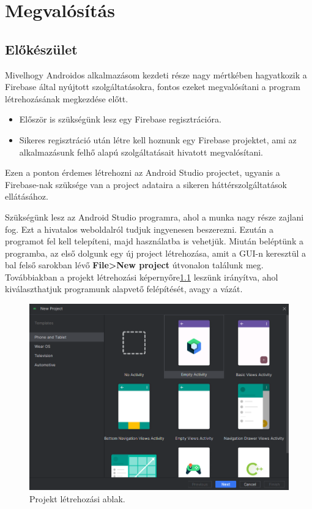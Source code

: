 \chapter{Megvalósítás}

\section{Előkészület}

Mivelhogy Androidos alkalmazásom kezdeti része nagy mértkében hagyatkozik a Firebase által nyújtott szolgáltatásokra, fontos ezeket megvalósítani a program létrehozásának megkezdése előtt.
\begin{itemize}
    \item Először is szükségünk lesz egy Firebase regisztrációra.
    \item Sikeres regisztráció után létre kell hoznunk egy Firebase projektet, ami az alkalmazásunk felhő alapú szolgáltatásait hivatott megvalósítani.
\end{itemize}

Ezen a ponton érdemes létrehozni az Android Studio projectet, ugyanis a Firebase-nak szüksége van a project adataira a sikeren háttérszolgáltatások ellátásához.

Szükségünk lesz az Android Studio programra, ahol a munka nagy része zajlani fog.
Ezt a hivatalos weboldalról\cite{AndroidStudio} tudjuk ingyenesen beszerezni.
Ezután a programot fel kell telepíteni, majd használatba is vehetjük.
Miután beléptünk a programba, az első dolgunk egy új project létrehozása, amit a GUI-n keresztül a bal felső sarokban lévő \textbf{File>New project} útvonalon találunk meg.
Továbbiakban a projekt létrehozási képernyőre\ref{fig:newproject} leszünk irányítva, ahol kiválaszthatjuk programunk alapvető felépítését, avagy a vázát.

\begin{figure}[h]
\centering
\includegraphics[scale=0.4]{images/android studio.png}
\caption{Projekt létrehozási ablak.}
\label{fig:newproject}
\end{figure}

